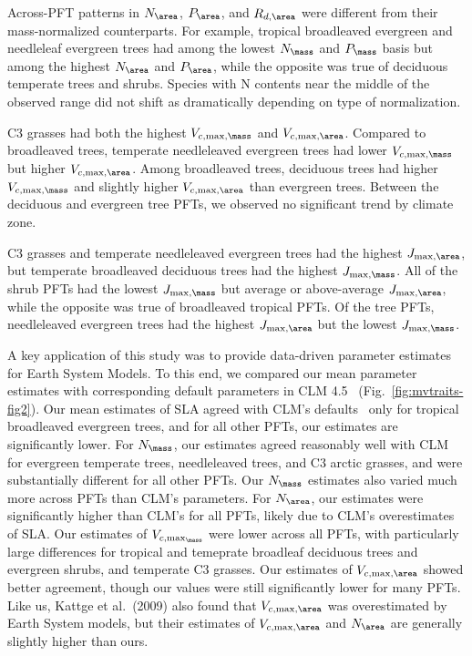Across-PFT patterns in $N_{\area}$, $P_{\area}$, and $R_{d,\area}$ were different from their mass-normalized counterparts.
For example, tropical broadleaved evergreen and needleleaf evergreen trees had among the lowest $N_{\mass}$ and $P_{\mass}$ basis but among the highest $N_{\area}$ and $P_{\area}$, while the opposite was true of deciduous temperate trees and shrubs.
Species with N contents near the middle of the observed range did not shift as dramatically depending on type of normalization.

C3 grasses had both the highest $V_{c,\max,\mass}$ and $V_{c,\max,\area}$.
Compared to broadleaved trees, temperate needleleaved evergreen trees had lower $V_{c,\max,\mass}$ but higher $V_{c,\max,\area}$.
Among broadleaved trees, deciduous trees had higher $V_{c,\max,\mass}$ and slightly higher $V_{c,\max,\area}$ than evergreen trees.
Between the deciduous and evergreen tree PFTs, we observed no significant trend by climate zone.

C3 grasses and temperate needleleaved evergreen trees had the highest $J_{\max,\area}$, but temperate broadleaved deciduous trees had the highest $J_{\max,\mass}$.
All of the shrub PFTs had the lowest $J_{\max,\mass}$ but average or above-average $J_{\max,\area}$, while the opposite was true of broadleaved tropical PFTs.
Of the tree PFTs, needleleaved evergreen trees had the highest $J_{\max,\area}$ but the lowest $J_{\max,\mass}$.

A key application of this study was to provide data-driven parameter estimates for Earth System Models.
To this end, we compared our mean parameter estimates with corresponding default parameters in CLM 4.5~\cite{clm45_note} (Fig.~\ref{fig:mvtraits-fig2}).
Our mean estimates of SLA agreed with CLM's defaults~\cite[Table 8.1 in]{clm45_note} only for tropical broadleaved evergreen trees, and for all other PFTs, our estimates are significantly lower.
For $N_{\mass}$, our estimates agreed reasonably well with CLM for evergreen temperate trees, needleleaved trees, and C3 arctic grasses, and were substantially different for all other PFTs.
Our $N_{\mass}$ estimates also varied much more across PFTs than CLM's parameters.
For $N_{\area}$, our estimates were significantly higher than CLM's for all PFTs, likely due to CLM's overestimates of SLA\@.
Our estimates of $V_{c,\max_\mass}$ were lower across all PFTs, with particularly large differences for tropical and temeprate broadleaf deciduous trees and evergreen shrubs, and temperate C3 grasses.
Our estimates of $V_{c,\max,\area}$ showed better agreement, though our values were still significantly lower for many PFTs.
Like us, Kattge et al.~(2009) \nocite{kattge_2009_vcmax} also found that $V_{c,\max,\area}$ was overestimated by Earth System models,
but their estimates of $V_{c,\max,\area}$ and $N_{\area}$ are generally slightly higher than ours.

